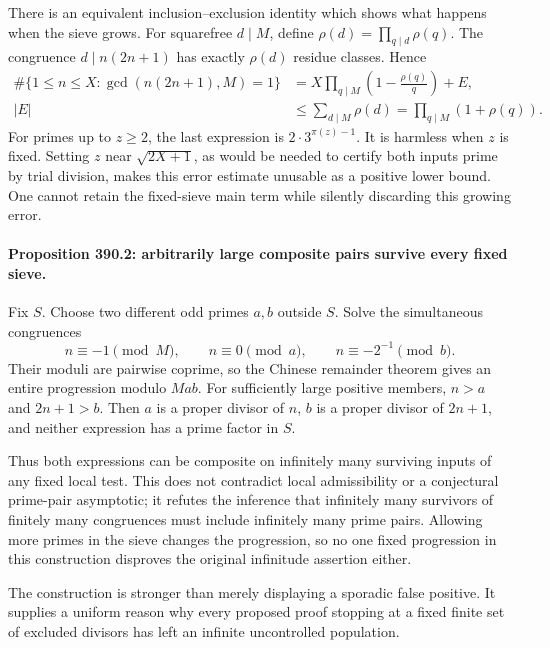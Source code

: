 \documentclass[11pt]{article}
\begin{document}
There is an equivalent inclusion--exclusion identity which shows what happens when the sieve grows. For squarefree $d\mid M$, define $\rho(d)=\prod_{q\mid d}\rho(q)$. The congruence $d\mid n(2n+1)$ has exactly $\rho(d)$ residue classes. Hence
\begin{align*}
 \#\{1\leq n\leq X:\gcd(n(2n+1),M)=1\}
 &=X\prod_{q\mid M}\left(1-\frac{\rho(q)}q\right)+E,\\
 |E|&\leq\sum_{d\mid M}\rho(d)=\prod_{q\mid M}(1+\rho(q)).
\end{align*}
For primes up to $z\geq2$, the last expression is $2\cdot3^{\pi(z)-1}$. It is harmless when $z$ is fixed. Setting $z$ near $\sqrt{2X+1}$, as would be needed to certify both inputs prime by trial division, makes this error estimate unusable as a positive lower bound. One cannot retain the fixed-sieve main term while silently discarding this growing error.

\paragraph{Proposition 390.2: arbitrarily large composite pairs survive every fixed sieve.}
Fix $S$. Choose two different odd primes $a,b$ outside $S$. Solve the simultaneous congruences
\[
 n\equiv-1\pmod M,\qquad n\equiv0\pmod a,
 \qquad n\equiv-2^{-1}\pmod b.
\]
Their moduli are pairwise coprime, so the Chinese remainder theorem gives an entire progression modulo $Mab$. For sufficiently large positive members, $n>a$ and $2n+1>b$. Then $a$ is a proper divisor of $n$, $b$ is a proper divisor of $2n+1$, and neither expression has a prime factor in $S$.

Thus both expressions can be composite on infinitely many surviving inputs of any fixed local test. This does not contradict local admissibility or a conjectural prime-pair asymptotic; it refutes the inference that infinitely many survivors of finitely many congruences must include infinitely many prime pairs. Allowing more primes in the sieve changes the progression, so no one fixed progression in this construction disproves the original infinitude assertion either.

The construction is stronger than merely displaying a sporadic false positive. It supplies a uniform reason why every proposed proof stopping at a fixed finite set of excluded divisors has left an infinite uncontrolled population.
\end{document}
